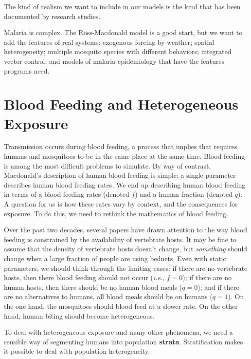 \documentclass[
]{book}
\begin{document}
The kind of realism we want to include in our models is the kind that has been documented by research studies.

Malaria is complex. The Ross-Macdonald model is a good start, but we want to add the features of real systems: exogenous forcing by weather; spatial heterogeneity; multiple mosquito species with different behaviors; integrated vector control; and models of malaria epidemiology that have the features programs need.

\hypertarget{blood-feeding-and-heterogeneous-exposure}{%
\section{Blood Feeding and Heterogeneous Exposure}\label{blood-feeding-and-heterogeneous-exposure}}

Transmission occurs during blood feeding, a process that implies that requires humans and mosquitoes to be in the same place at the same time. Blood feeding is among the most difficult problems to simulate. By way of contrast, Macdonald's description of human blood feeding is simple: a single parameter describes human blood feeding rates.
We end up describing human blood feeding in terms of a blood feeding rates (denoted \(f\)) and a human fraction (denoted \(q\)). A question for us is how these rates vary by context, and the consequences for exposure. To do this, we need to rethink the mathematics of blood feeding.

Over the past two decades, several papers have drawn attention to the way blood feeding is constrained by the availability of vertebrate hosts. It may be fine to assume that the density of vertebrate hosts doesn't change, but \emph{something} should change when a large fraction of people are using bednets. Even with static parameters, we should think through the limiting cases: if there are no vertebrate hosts, then there blood feeding should not occur (\emph{i.e.}, \(f=0\)); if there are no human hosts, then there should be no human blood meals (\(q=0\)); and if there are no alternatives to humans, all blood meals should be on humans (\(q=1\)). On the one hand, the mosquitoes should blood feed at a slower rate. On the other hand, human biting should become heterogeneous.

To deal with heterogeneous exposure and many other phenomena, we need a sensible way of segmenting humans into population \textbf{strata}. Stratification makes it possible to deal with population heterogeneity.
\end{document}
